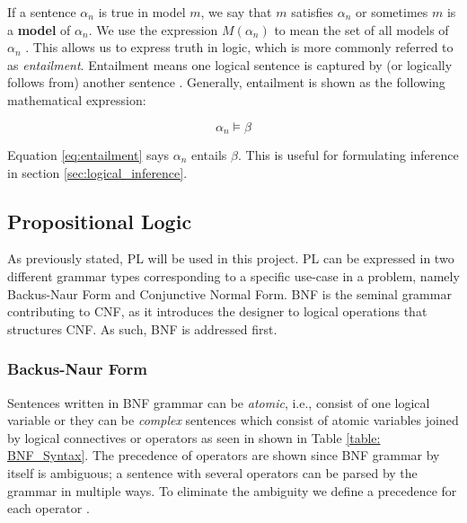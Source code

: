 If a sentence $\alpha_n$ is true in model $m$, we say that $m$ satisfies $\alpha_n$ or sometimes $m$ is a \textbf{model} of $\alpha_n$. We use the expression $M(\alpha_n)$ to mean the set of all models of $\alpha_n$ . This allows us to express truth in logic, which is more commonly referred to as \textit{entailment}. Entailment means one logical sentence is captured by (or logically follows from) another sentence \citep{russell2016artificial}. Generally, entailment is shown as the following mathematical expression:

\begin{equation}
	\alpha_n \models \beta
	\label{eq:entailment}
\end{equation}

Equation \ref{eq:entailment} says $\alpha_n$ entails $\beta$. This is useful for formulating inference in section \ref{sec:logical_inference}.


\subsection{Propositional Logic}

As previously stated, PL will be used in this project. PL can be expressed in two different grammar types corresponding to a specific use-case in a problem, namely Backus-Naur Form and Conjunctive Normal Form. BNF is the seminal grammar contributing to CNF, as it introduces the designer to logical operations that structures CNF. As such, BNF is addressed first. 

\subsubsection{Backus-Naur Form}
\label{subsubsec:BNF}

Sentences written in BNF grammar can be \textit{atomic}, i.e., consist of one logical variable or they can be \textit{complex} sentences which consist of atomic variables joined by logical connectives or operators as seen in shown in Table \ref{table: BNF_Syntax}. The precedence of operators are shown since  BNF grammar by itself is ambiguous; a sentence with
several operators can be parsed by the grammar in multiple ways. To eliminate the ambiguity
we define a precedence for each operator \citep{russell2016artificial}.

